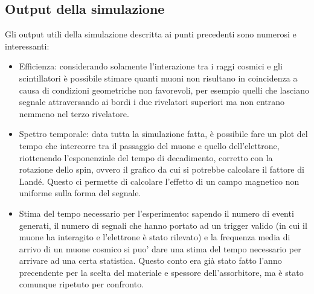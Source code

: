 \subsection{Output della simulazione}
Gli output utili della simulazione descritta ai punti precedenti sono numerosi e interessanti:
\begin{itemize}
\item Efficienza: considerando solamente l'interazione tra i raggi cosmici e gli scintillatori è possibile stimare quanti muoni non risultano in coincidenza a causa
di condizioni geometriche non favorevoli, per esempio quelli che lasciano segnale attraversando ai bordi i due rivelatori superiori ma non entrano nemmeno nel terzo
rivelatore.
\item Spettro temporale: data tutta la simulazione fatta, è possibile fare un plot del tempo che intercorre tra il passaggio del muone e quello dell'elettrone, riottenendo
l'esponenziale del tempo di decadimento, corretto con la rotazione dello spin, ovvero il grafico da cui si potrebbe calcolare il fattore di Land\'e. Questo ci permette di calcolare l'effetto di un campo magnetico non uniforme sulla forma del segnale.
\item Stima del tempo necessario per l'esperimento: sapendo il numero di eventi generati, il numero di segnali che hanno portato ad un trigger valido (in cui il muone ha interagito e l'elettrone \`e stato rilevato) e la frequenza media di arrivo di un muone cosmico si puo' dare una stima del tempo necessario per arrivare ad una certa statistica. Questo conto era gi\`a stato fatto l'anno precendente per la scelta del materiale e spessore dell'assorbitore, ma \`e stato comunque ripetuto per confronto.
\end{itemize}




